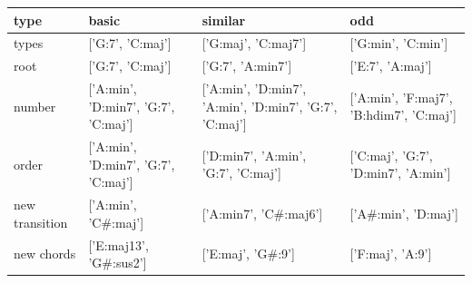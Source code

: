 \begin{tabular}{llll}
\toprule
type & basic & similar & odd \\
\midrule
types & ['G:7', 'C:maj'] & ['G:maj', 'C:maj7'] & ['G:min', 'C:min'] \\
root & ['G:7', 'C:maj'] & ['G:7', 'A:min7'] & ['E:7', 'A:maj'] \\
number & ['A:min', 'D:min7', 'G:7', 'C:maj'] & ['A:min', 'D:min7', 'A:min', 'D:min7', 'G:7', 'C:maj'] & ['A:min', 'F:maj7', 'B:hdim7', 'C:maj'] \\
order & ['A:min', 'D:min7', 'G:7', 'C:maj'] & ['D:min7', 'A:min', 'G:7', 'C:maj'] & ['C:maj', 'G:7', 'D:min7', 'A:min'] \\
new transition & ['A:min', 'C\#:maj'] & ['A:min7', 'C\#:maj6'] & ['A\#:min', 'D:maj'] \\
new chords & ['E:maj13', 'G\#:sus2'] & ['E:maj', 'G\#:9'] & ['F:maj', 'A:9'] \\
\bottomrule
\end{tabular}
